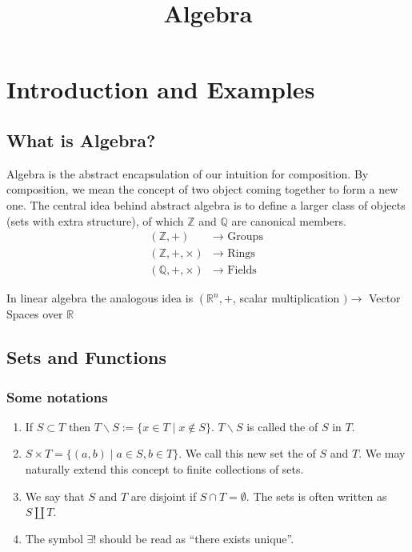 \documentclass{article}
\title{Algebra}
\begin{document}
\maketitle

\section{Introduction and Examples}
\subsection{What is Algebra?}
Algebra is the abstract encapsulation of our intuition for composition. By composition, we mean the concept of two object coming together to form a new one. 
The central idea behind abstract algebra is to define a larger class of objects (sets with extra structure), of which $\mathbb{Z}$ and $\mathbb{Q}$ are  canonical members.
$$
\begin{aligned}
(\mathbb{Z},+) & \longrightarrow \text { Groups } \\
(\mathbb{Z},+, \times) & \longrightarrow \text { Rings } \\
(\mathbb{Q},+, \times) & \longrightarrow \text { Fields }
\end{aligned}
$$
\begin{rema}
In linear algebra the analogous idea is
$\left(\mathbb{R}^{n},+\right.$, scalar multiplication $) \longrightarrow$ Vector Spaces over $\mathbb{R}$
\end{rema}
\subsection{Sets and Functions}
\subsubsection{Some notations}
\begin{enumerate}
    \item If $S \subset T$ then $T \backslash S:=\{x \in T \mid x \notin S\} $.  $T \backslash S$ is called the  of $S$ in $T$.
    \item $S \times T=\{(a, b) \mid a \in S, b \in T\}$. We call this new set the  of $S$ and $T$. We may naturally extend this concept to finite collections of sets.
    \item We say that $S$ and $T$ are disjoint if $S \cap T=\emptyset$. The  sets is often written as $S \coprod T$.
    \item The symbol $\exists !$ should be read as ``there exists unique''.
\end{enumerate}
\end{document}
